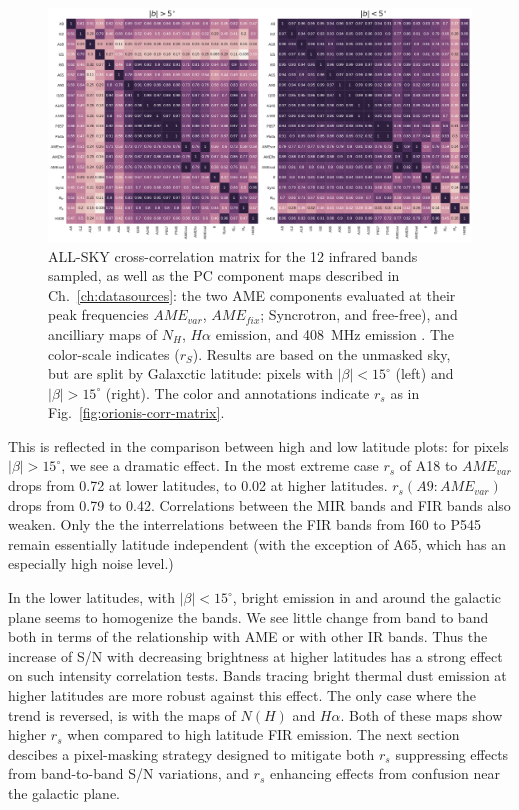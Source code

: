           \begin{figure}
            \includegraphics[width=\textwidth]{../Plots/ch_allsky/all_bands_corr_matrix_wAME_spearmanintensity_unmasked.pdf}
            \centering
            \caption{ALL-SKY cross-correlation matrix for the 12 infrared bands sampled, as well as the PC component maps described in Ch.~\ref{ch:datasources}: the two AME components evaluated at their peak frequencies $AME_{var}$, $AME_{fix}$; Syncrotron, and free-free), and ancilliary maps of $N_{H}$, $H{\alpha}$ emission, and 408~MHz emission \cite{haslam82}. The color-scale indicates ($r_{S}$). Results are based on the unmasked sky, but are split by Galaxctic latitude: pixels with $|\beta{}| < 15^{\circ}$ (left) and $|\beta{}| > 15^{\circ}$ (right). The color and annotations indicate $r_{s}$ as in Fig.~\ref{fig:orionis-corr-matrix}. }
            \label{fig:all_bands_corr_matrix_wAME_spearman}
          \end{figure}
       This is reflected in the comparison between high and low latitude plots: for pixels $|\beta| > 15 ^{\circ}$, we see a dramatic effect. In the most extreme case $r_{s}$ of A18 to $AME_{var}$ drops from 0.72 at lower latitudes, to 0.02 at higher latitudes. $r_{s}(A9:AME_{var})$ drops from 0.79 to 0.42. Correlations between the MIR bands and FIR bands also weaken. Only the the interrelations between the FIR bands from I60 to P545 remain essentially latitude independent (with the exception of A65, which has an especially high noise level.)

        In the lower latitudes, with $|\beta| < 15^{\circ}$, bright emission in and around the galactic plane seems to homogenize the bands. We see little change from band to band both in terms of the relationship with AME or with other IR bands. Thus the increase of S/N with decreasing brightness at higher latitudes has a strong effect on such intensity correlation tests. Bands tracing bright thermal dust emission at higher latitudes are more robust against this effect. The only case where the trend is reversed, is with the maps of $N(H)$ and $H{\alpha}$. Both of these maps show higher $r_{s}$ when compared to high latitude FIR emission. The next section descibes a pixel-masking strategy designed to mitigate both $r_{s}$ suppressing effects from band-to-band S/N variations, and $r_{s}$ enhancing effects from confusion near the galactic plane.

